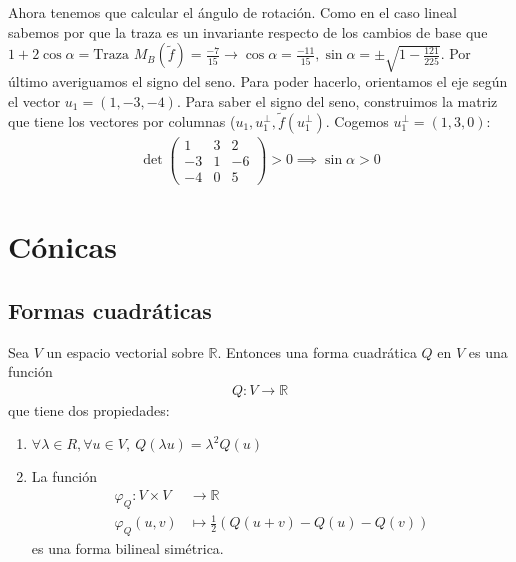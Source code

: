 \documentclass[14pt]{book}
\begin{document}
\begin{ej}
	Ahora tenemos que calcular el ángulo de rotación. Como en el caso lineal sabemos por que la traza es un invariante respecto de los cambios de base que $1 + 2\cos \alpha = \text{Traza } M_B(\tilde{f}) = \frac{-7}{15} \to \cos \alpha = \frac{-11}{15}, \sin \alpha = \pm \sqrt{1 - \frac{121}{225}}$. Por último averiguamos el signo del seno. Para poder hacerlo, orientamos el eje según el vector $u_1 = (1, -3, -4)$. Para saber el signo del seno, construimos la matriz que tiene los vectores por columnas ($u_1, u_1^\perp, \tilde{f}(u_1^\perp)$. Cogemos $u_1^\perp = (1, 3, 0)$:
	\begin{align*}
		\det \left(\begin{array}{ccc}
		1 & 3 & 2 \\
		-3 & 1 & -6 \\
		-4 & 0 & 5
		\end{array}\right) > 0 \implies \sin \alpha > 0
	\end{align*}
\end{ej}

\chapter{Cónicas}
\section{Formas cuadráticas}
\begin{dfn}
	Sea $V$ un espacio vectorial sobre $\mathbb{R}$. Entonces una forma cuadrática $Q$ en $V$ es una función
	\begin{align*}
		Q : V \to \mathbb{R}
	\end{align*}
	que tiene dos propiedades:
	\begin{enumerate}
		\item $\forall \lambda \in R, \forall u \in V,\ Q(\lambda u) = \lambda^2 Q(u)$
		\item La función
		\begin{align*}
			\varphi_Q : V \times V &\to \mathbb{R}\\
			 \varphi_Q (u, v) &\mapsto \frac{1}{2} (Q(u + v) - Q(u) - Q(v))
		\end{align*}
		es una forma bilineal simétrica.
	\end{enumerate}
\end{dfn}
\end{document}
